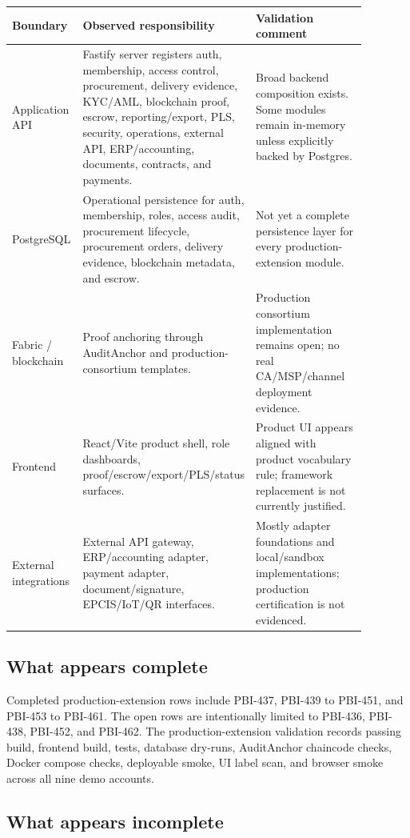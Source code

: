 \documentclass[11pt,a4paper]{article}
\begin{document}
\begin{longtable}{P{0.20\linewidth}P{0.36\linewidth}P{0.32\linewidth}}
\toprule
Boundary & Observed responsibility & Validation comment \\
\midrule
Application API & Fastify server registers auth, membership, access control, procurement, delivery evidence, KYC/AML, blockchain proof, escrow, reporting/export, PLS, security, operations, external API, ERP/accounting, documents, contracts, and payments. & Broad backend composition exists. Some modules remain in-memory unless explicitly backed by Postgres. \\
PostgreSQL & Operational persistence for auth, membership, roles, access audit, procurement lifecycle, procurement orders, delivery evidence, blockchain metadata, and escrow. & Not yet a complete persistence layer for every production-extension module. \\
Fabric / blockchain & Proof anchoring through AuditAnchor and production-consortium templates. & Production consortium implementation remains open; no real CA/MSP/channel deployment evidence. \\
Frontend & React/Vite product shell, role dashboards, proof/escrow/export/PLS/status surfaces. & Product UI appears aligned with product vocabulary rule; framework replacement is not currently justified. \\
External integrations & External API gateway, ERP/accounting adapter, payment adapter, document/signature, EPCIS/IoT/QR interfaces. & Mostly adapter foundations and local/sandbox implementations; production certification is not evidenced. \\
\bottomrule
\end{longtable}

\subsection{What appears complete}

Completed production-extension rows include PBI-437, PBI-439 to PBI-451, and PBI-453 to PBI-461. The open rows are intentionally limited to PBI-436, PBI-438, PBI-452, and PBI-462. The production-extension validation records passing build, frontend build, tests, database dry-runs, AuditAnchor chaincode checks, Docker compose checks, deployable smoke, UI label scan, and browser smoke across all nine demo accounts.

\subsection{What appears incomplete}
\end{document}
